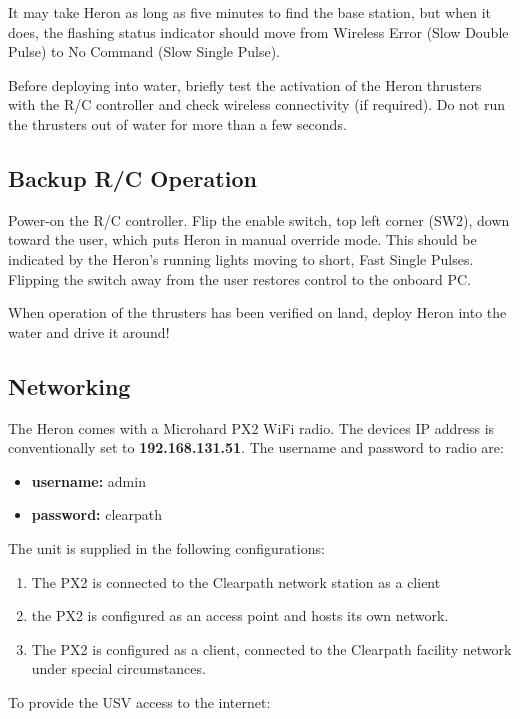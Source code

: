 \documentclass[]{clearpath-latex/clearpath-manual}
\begin{document}
It may take Heron as long as five minutes to find the base station, but when it does, the flashing status indicator should move from Wireless Error (Slow Double Pulse) to No Command (Slow Single Pulse).

Before deploying into water, briefly test the activation of the Heron thrusters with the R/C controller and check wireless connectivity (if required). Do not run the thrusters out of water for more than a few seconds.

\subsection{Backup R/C Operation} \label{backupoperation}
Power-on the R/C controller. Flip the enable switch, top left corner (SW2), down toward the user, which puts Heron in manual override mode. This should be indicated by the Heron's running lights moving to short, Fast Single Pulses. Flipping the switch away from the user restores control to the onboard PC.

When operation of the thrusters has been verified on land, deploy Heron into the water and drive it around!

\subsection{Networking}

The Heron comes with a Microhard PX2 WiFi radio. The devices IP address is conventionally set to \textbf{192.168.131.51}.
The username and password to radio are:
\begin{itemize}
\item \textbf{username:} admin
\item \textbf{password:} clearpath
\end{itemize}


 The unit is supplied in the following configurations:

\begin{enumerate}
\item The PX2 is connected to the Clearpath network station as a client
\item the PX2 is configured as an access point and hosts its own network.
\item The PX2 is configured as a client, connected to the Clearpath facility network under special circumstances.
\end{enumerate}

To provide the USV access to the internet:
\end{document}
